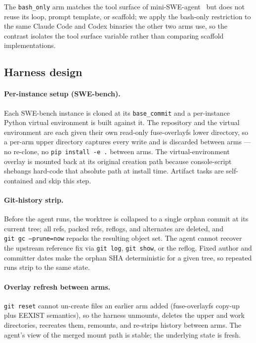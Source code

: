 The \texttt{bash\_only} arm matches the tool surface of
mini-SWE-agent~\cite{repo:miniswagent} but does not reuse its loop,
prompt template, or scaffold; we apply the bash-only restriction to
the same Claude Code and Codex binaries the other two arms use, so the
contrast isolates the tool surface variable rather than comparing
scaffold implementations.

\subsection{Harness design}
\label{sec:method-harness}

\paragraph{Per-instance setup (SWE-bench).} Each SWE-bench instance is
cloned at its \texttt{base\_commit} and a per-instance Python virtual
environment is built against it. The repository and the virtual
environment are each given their own read-only fuse-overlayfs lower
directory, so a per-arm upper directory captures every write and is
discarded between arms --- no re-clone, no
\texttt{pip~install~-e~.} between arms. The
virtual-environment overlay is mounted back at its original creation
path because console-script shebangs hard-code that absolute path at
install time. Artifact tasks are self-contained and skip this step.

\paragraph{Git-history strip.} Before the agent runs, the worktree is
collapsed to a single orphan commit at its current tree; all refs,
packed refs, reflogs, and alternates are deleted, and
\texttt{git~gc~--prune=now} repacks the resulting object set. The
agent cannot recover the upstream reference fix via \texttt{git~log},
\texttt{git~show}, or the reflog. Fixed author and committer dates
make the orphan SHA deterministic for a given tree, so repeated runs
strip to the same state.

\paragraph{Overlay refresh between arms.} \texttt{git~reset} cannot
un-create files an earlier arm added (fuse-overlayfs copy-up plus
EEXIST semantics), so the harness unmounts, deletes the upper and
work directories, recreates them, remounts, and re-strips history
between arms. The agent's view of the merged mount path is stable;
the underlying state is fresh.

